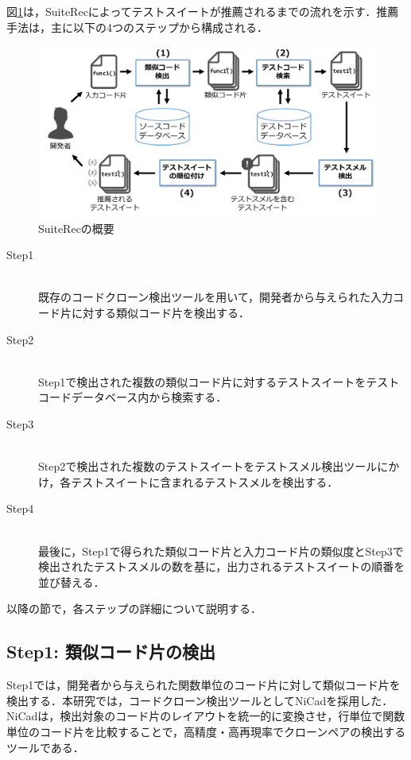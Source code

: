 \documentclass[12pt]{jarticle} %
\begin{document}
図\ref{SO}は，{\sf SuiteRec}によってテストスイートが推薦されるまでの流れを示す．推薦手法は，主に以下の4つのステップから構成される．

\begin{figure}[htbp]
\begin{center}
\includegraphics[clip,width=15cm]{pic/SuiteRec-outline.pdf}
\caption{{\sf SuiteRec}の概要}
\label{SO}
\end{center}
\end{figure}

\newpage
\begin{description}
\item[Step1]~\\
既存のコードクローン検出ツールを用いて，開発者から与えられた入力コード片に対する類似コード片を検出する．
\item[Step2]~\\
Step1で検出された複数の類似コード片に対するテストスイートをテストコードデータベース内から検索する．
\item[Step3]~\\
Step2で検出された複数のテストスイートをテストスメル検出ツールにかけ，各テストスイートに含まれるテストスメルを検出する．
\item[Step4]~\\
最後に，Step1で得られた類似コード片と入力コード片の類似度とStep3で検出されたテストスメルの数を基に，出力されるテストスイートの順番を並び替える．
\end{description}

以降の節で，各ステップの詳細について説明する．

\subsection{Step1: 類似コード片の検出}

Step1では，開発者から与えられた関数単位のコード片に対して類似コード片を検出する．本研究では，コードクローン検出ツールとして{\sf NiCad}\cite{b2}を採用した．{\sf NiCad}は，検出対象のコード片のレイアウトを統一的に変換させ，行単位で関数単位のコード片を比較することで，高精度・高再現率でクローンペアの検出するツールである．
\end{document}
